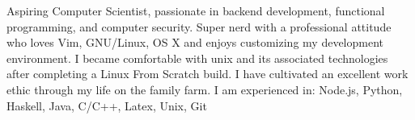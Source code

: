

\begin{cvparagraph}

Aspiring Computer Scientist, passionate in backend development, functional programming, 
and computer security. Super nerd with a professional attitude who loves Vim, GNU/Linux, OS X and enjoys customizing 
my development environment. I became comfortable with unix and its associated technologies after completing a Linux From Scratch build. 
I have cultivated an excellent work ethic through my life on the family farm.
I am experienced in: Node.js, Python, Haskell, Java, C/C++, Latex, Unix, Git
\end{cvparagraph}
